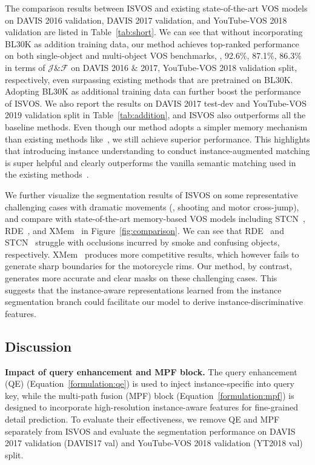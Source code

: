 \documentclass[10pt,twocolumn,letterpaper]{article}
\newcommand{\system}{ISVOS\xspace}
\begin{document}
The comparison results between \system and existing state-of-the-art VOS models on DAVIS 2016 validation, DAVIS 2017 validation, and YouTube-VOS 2018 validation are listed in Table~\ref{tab:short}. We can see that without incorporating BL30K as addition training data, our method achieves top-ranked performance on both single-object and multi-object VOS benchmarks, \ie, 92.6\%, 87.1\%, 86.3\% in terms of $\mathcal{J\&F}$ on DAVIS 2016 $\&$ 2017, YouTube-VOS 2018 validation split, respectively, even surpassing existing methods that are pretrained on BL30K. Adopting BL30K as additional training data can further 
boost the performance of \system. We also report the results on DAVIS 2017 test-dev and YouTube-VOS 2019 validation split in Table~\ref{tab:addition}, and \system also outperforms all the baseline methods. Even though our method adopts a simpler memory mechanism than existing methods like~\cite{seong2021hierarchical,xu2022reliable,cheng2022xmem}, we still achieve superior performance. This highlights that introducing instance understanding to conduct instance-augmented matching is super helpful and clearly outperforms the vanilla semantic matching used in the existing methods~\cite{oh2019video,cheng2021stcn,cheng2022xmem}. 

We further visualize the segmentation results of \system on some representative challenging cases with dramatic movements (\eg, shooting and motor cross-jump), and compare with state-of-the-art memory-based VOS models including STCN~\cite{cheng2021stcn}, RDE~\cite{li2022recurrent}, and XMem~\cite{cheng2022xmem} in Figure~\ref{fig:comparison}. We can see that RDE~\cite{li2022recurrent} and STCN~\cite{cheng2021stcn} struggle with occlusions incurred by smoke and confusing objects, respectively. XMem~\cite{cheng2022xmem} produces more competitive results, which however fails to generate sharp boundaries for the motorcycle rims. Our method, by contrast, generates more accurate and clear masks on these challenging cases. This suggests that the instance-aware representations learned from the instance segmentation branch could facilitate our model to derive instance-discriminative features.

\subsection{Discussion}
\noindent \textbf{Impact of query enhancement and MPF block.} The query enhancement (QE) (Equation~\ref{formulation:qe}) is used to inject instance-specific into query key, while the multi-path fusion (MPF) block (Equation~\ref{formulation:mpf}) is designed to incorporate high-resolution instance-aware features for fine-grained detail prediction. To evaluate their effectiveness, we remove QE and MPF separately from \system and evaluate the segmentation performance on DAVIS 2017 validation (DAVIS17 val) and YouTube-VOS 2018 validation (YT2018 val) split.
\end{document}

